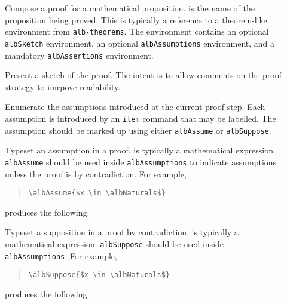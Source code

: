 \documentclass[11pt,a4paper,oneside,titlepage]{alb-corp}
\begin{document}
\begin{description}
\item[] Compose a proof for a
  mathematical proposition.   is the name of the
  proposition being proved.  This is typically a reference to a
  theorem-like environment from \texttt{alb-theorems}.  The environment
  contains an optional \texttt{albSketch} environment, an optional
  \texttt{albAssumptions} environment, and a mandatory
  \texttt{albAssertions} environment.

\item[] Present a sketch of the proof.  The intent
  is to allow comments on the proof strategy to imrpove readability.

\item[] Enumerate the assumptions introduced
  at the current proof step.  Each assumption is introduced by an
  \texttt{item} command that may be labelled.  The assumption should be
  marked up using either \texttt{albAssume} or \texttt{albSuppose}.

\item[] Typeset an assumption
  in a proof.   is typically a mathematical
  expression.  \texttt{albAssume} should be used inside
  \texttt{albAssumptions} to indicate assumptions unless the proof is by
  contradiction.  For example,
  \begin{quote}
\begin{verbatim}
\albAssume{$x \in \albNaturals$}
\end{verbatim}
  \end{quote}
  produces the following.
  \begin{quote}
  \end{quote}

\item[] Typeset a
  supposition in a proof by contradiction.   is
  typically a mathematical expression.  \texttt{albSuppose} should be
  used inside \texttt{albAssumptions}.  For example,
  \begin{quote}
\begin{verbatim}
\albSuppose{$x \in \albNaturals$}
\end{verbatim}
  \end{quote}
  produces the following.
  \begin{quote}
  \end{quote}


\end{description}
\end{document}
